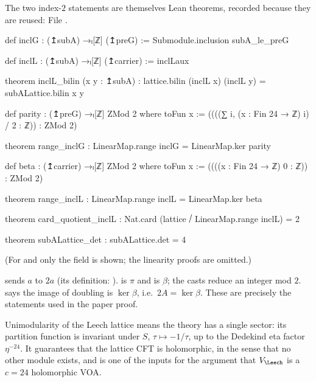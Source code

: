 The two index-$2$ statements are themselves Lean theorems, recorded because they are reused:
\noindent File .
\begin{leancode}
def inclG : (↥subA) →ₗ[ℤ] (↥preG) := Submodule.inclusion subA_le_preG

def inclL : (↥subA) →ₗ[ℤ] (↥carrier) := inclLaux

theorem inclL_bilin (x y : ↥subA) :
    lattice.bilin (inclL x) (inclL y) = subALattice.bilin x y

def parity : (↥preG) →ₗ[ℤ] ZMod 2 where
  toFun x := ((((∑ i, (x : Fin 24 → ℤ) i) / 2 : ℤ)) : ZMod 2)

theorem range_inclG : LinearMap.range inclG = LinearMap.ker parity

def beta : (↥carrier) →ₗ[ℤ] ZMod 2 where
  toFun x := ((((x : Fin 24 → ℤ) 0 : ℤ)) : ZMod 2)

theorem range_inclL : LinearMap.range inclL = LinearMap.ker beta

theorem card_quotient_inclL :
    Nat.card (lattice ⧸ LinearMap.range inclL) = 2

theorem subALattice_det : subALattice.det = 4
\end{leancode}
(For  and  only the  field is shown; the linearity proofs are omitted.)
\begin{dictionary}
 sends $a$ to $2a$ (its definition: ).
 is $\pi$ and  is $\beta$; the casts  reduce an
integer mod $2$.   says the image of doubling is $\ker\beta$, i.e.\ $2A=\ker\beta$.
These are precisely the statements used in the paper proof.
\end{dictionary}
\begin{physics}
Unimodularity of the Leech lattice means the theory has a single sector: its partition function is invariant under $S$, $\tau\mapsto-1/\tau$, up to the Dedekind eta factor $\eta^{-24}$. It guarantees that the lattice CFT is holomorphic, in the sense that no other module exists, and is one of the inputs for the argument that $V_\Leech$ is a $c=24$ holomorphic VOA.
\end{physics}

